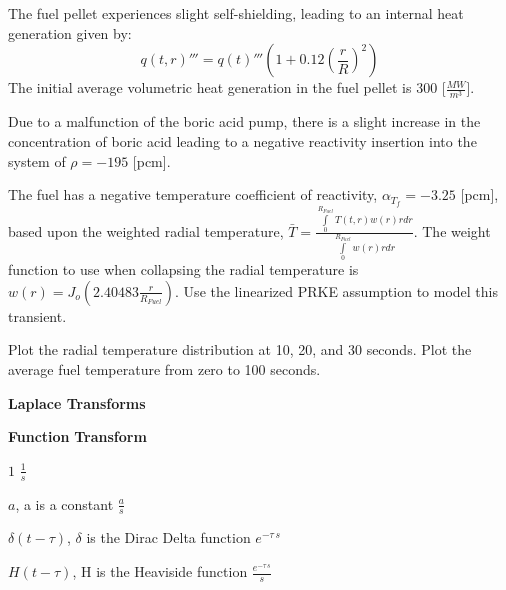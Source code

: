 \begin{questions}
{The fuel pellet experiences slight self-shielding, leading to an internal heat generation given by:
$$q(t,r)''' = q(t)'''\left(1+0.12(\frac{r}{R})^2\right)$$
The initial average volumetric heat generation in the fuel pellet is 300 [$\frac{MW}{m^3}$].

Due to a malfunction of the boric acid pump, there is a slight increase in the concentration of boric acid leading to a negative reactivity insertion into the system of $\rho = -195$ [pcm].

The fuel has a negative temperature coefficient of reactivity, $\alpha_{T_f} = -3.25 $ [pcm], based upon the weighted radial temperature, $\bar{T}=\displaystyle \frac{\int\limits_{0}^{R_{Fuel}}T(t,r)w(r)r dr}{\int\limits_{0}^{R_{Fuel}}w(r)r dr}$.
The weight function to use when collapsing the radial temperature is $w(r) = J_o(2.40483\frac{r}{R_{Fuel}})$.
Use the linearized PRKE assumption to model this transient.

Plot the radial temperature distribution at 10, 20, and 30 seconds.
Plot the average fuel temperature from zero to 100 seconds.

\fullwidth{\begin{solution}
\end{solution}}}


\end{questions}
\pagebreak
\thispagestyle{head}
\begin{center}
\textbf{Laplace Transforms}
\end{center}


\textbf{Function} \hfill \textbf{Transform}

$1$ \hfill $\displaystyle\frac{1}{s}$

$a$, a is a constant \hfill $\displaystyle\frac{a}{s}$

$\delta(t-\tau)$, $\delta$ is the Dirac Delta function \hfill $e^{-\tau\, s}$

$H(t-\tau)$, H is the Heaviside function \hfill $\displaystyle\frac{e^{-\tau\,s}}{s}$

